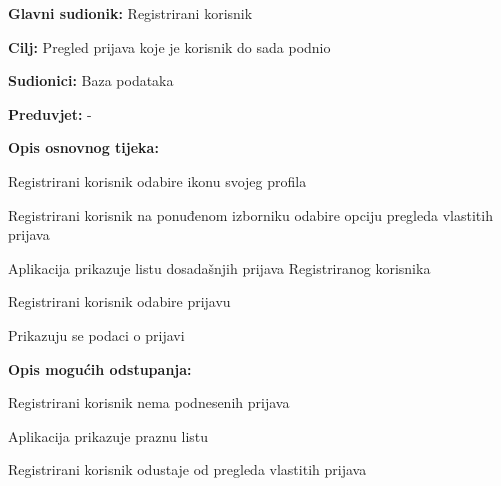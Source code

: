 				
				\noindent {}
				\begin{packed_item}
					
					\item \textbf{Glavni sudionik:} Registrirani korisnik
					\item  \textbf{Cilj:} Pregled prijava koje je korisnik do sada podnio
					\item  \textbf{Sudionici:} Baza podataka
					\item  \textbf{Preduvjet:} -
					
					\item  \textbf{Opis osnovnog tijeka:}
					\item[] \begin{packed_enum}
						\item Registrirani korisnik odabire ikonu svojeg profila
						\item Registrirani korisnik na ponuđenom izborniku odabire opciju pregleda vlastitih prijava
						\item Aplikacija prikazuje listu dosadašnjih prijava Registriranog korisnika
						\item Registrirani korisnik odabire prijavu
						\item Prikazuju se podaci o prijavi
					\end{packed_enum}
					
					\item  \textbf{Opis mogućih odstupanja:}
					\item[] \begin{packed_item}
						\item[4.a] Registrirani korisnik nema podnesenih prijava
						\item[] \begin{packed_enum}
							\item Aplikacija prikazuje praznu listu
							\item Registrirani korisnik odustaje od pregleda vlastitih prijava
						\end{packed_enum}
					\end{packed_item}
				\end{packed_item}
				
